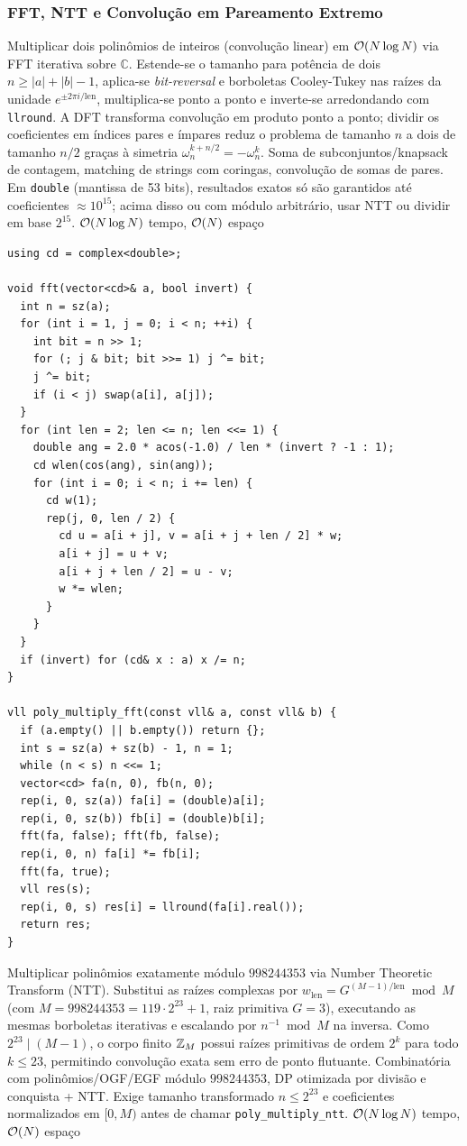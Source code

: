 \subsubsection{FFT, NTT e Convolução em Pareamento Extremo}
\algobox
  {Multiplicar dois polinômios de inteiros (convolução linear) em $\mathcal{O}(N \log N)$ via FFT iterativa sobre $\mathbb{C}$.}
  {Estende-se o tamanho para potência de dois $n \ge |a| + |b| - 1$, aplica-se \emph{bit-reversal} e borboletas Cooley-Tukey nas raízes da unidade $e^{\pm 2\pi i / \text{len}}$, multiplica-se ponto a ponto e inverte-se arredondando com \texttt{llround}.}
  {A DFT transforma convolução em produto ponto a ponto; dividir os coeficientes em índices pares e ímpares reduz o problema de tamanho $n$ a dois de tamanho $n/2$ graças à simetria $\omega_n^{k + n/2} = -\omega_n^k$.}
  {Soma de subconjuntos/knapsack de contagem, matching de strings com coringas, convolução de somas de pares.}
  {Em \texttt{double} (mantissa de 53 bits), resultados exatos só são garantidos até coeficientes $\approx 10^{15}$; acima disso ou com módulo arbitrário, usar NTT ou dividir em base $2^{15}$.}
  {$\mathcal{O}(N \log N)$ tempo, $\mathcal{O}(N)$ espaço}

\begin{lstlisting}
using cd = complex<double>;

void fft(vector<cd>& a, bool invert) {
  int n = sz(a);
  for (int i = 1, j = 0; i < n; ++i) {
    int bit = n >> 1;
    for (; j & bit; bit >>= 1) j ^= bit;
    j ^= bit;
    if (i < j) swap(a[i], a[j]);
  }
  for (int len = 2; len <= n; len <<= 1) {
    double ang = 2.0 * acos(-1.0) / len * (invert ? -1 : 1);
    cd wlen(cos(ang), sin(ang));
    for (int i = 0; i < n; i += len) {
      cd w(1);
      rep(j, 0, len / 2) {
        cd u = a[i + j], v = a[i + j + len / 2] * w;
        a[i + j] = u + v;
        a[i + j + len / 2] = u - v;
        w *= wlen;
      }
    }
  }
  if (invert) for (cd& x : a) x /= n;
}

vll poly_multiply_fft(const vll& a, const vll& b) {
  if (a.empty() || b.empty()) return {};
  int s = sz(a) + sz(b) - 1, n = 1;
  while (n < s) n <<= 1;
  vector<cd> fa(n, 0), fb(n, 0);
  rep(i, 0, sz(a)) fa[i] = (double)a[i];
  rep(i, 0, sz(b)) fb[i] = (double)b[i];
  fft(fa, false); fft(fb, false);
  rep(i, 0, n) fa[i] *= fb[i];
  fft(fa, true);
  vll res(s);
  rep(i, 0, s) res[i] = llround(fa[i].real());
  return res;
}
\end{lstlisting}

\algobox
  {Multiplicar polinômios exatamente módulo $998244353$ via Number Theoretic Transform (NTT).}
  {Substitui as raízes complexas por $w_{\text{len}} = G^{(M-1)/\text{len}} \bmod M$ (com $M = 998244353 = 119 \cdot 2^{23} + 1$, raiz primitiva $G = 3$), executando as mesmas borboletas iterativas e escalando por $n^{-1} \bmod M$ na inversa.}
  {Como $2^{23} \mid (M - 1)$, o corpo finito $\mathbb{Z}_M$ possui raízes primitivas de ordem $2^k$ para todo $k \le 23$, permitindo convolução exata sem erro de ponto flutuante.}
  {Combinatória com polinômios/OGF/EGF módulo $998244353$, DP otimizada por divisão e conquista + NTT.}
  {Exige tamanho transformado $n \le 2^{23}$ e coeficientes normalizados em $[0, M)$ antes de chamar \texttt{poly\_multiply\_ntt}.}
  {$\mathcal{O}(N \log N)$ tempo, $\mathcal{O}(N)$ espaço}

